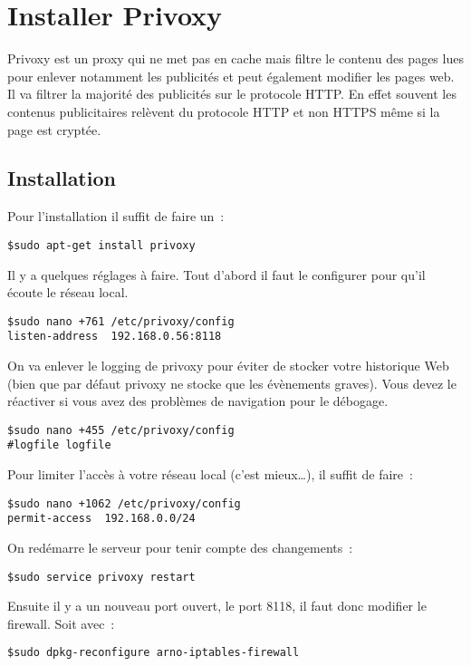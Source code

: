\section{Installer Privoxy}

Privoxy est un proxy qui ne met pas en cache mais filtre le contenu des pages lues pour enlever notamment les publicités et peut également modifier les pages web. Il va filtrer la majorité des publicités sur le protocole HTTP. En effet souvent les contenus publicitaires relèvent du protocole HTTP et non HTTPS même si la page est cryptée.

\subsection{Installation}

Pour l'installation il suffit de faire un~:
\begin{verbatim}
$sudo apt-get install privoxy
\end{verbatim}

Il y a quelques réglages à faire. Tout d'abord il faut le configurer pour qu'il écoute le réseau local.

\begin{verbatim}
$sudo nano +761 /etc/privoxy/config
listen-address  192.168.0.56:8118
\end{verbatim}

On va enlever le logging de privoxy pour éviter de stocker votre historique Web (bien que par défaut privoxy ne stocke que les évènements graves). Vous devez le réactiver si vous avez des problèmes de navigation pour le débogage.

\begin{verbatim}
$sudo nano +455 /etc/privoxy/config
#logfile logfile
\end{verbatim}

Pour limiter l'accès à votre réseau local (c'est mieux\dots), il suffit de faire~:
\begin{verbatim}
$sudo nano +1062 /etc/privoxy/config
permit-access  192.168.0.0/24
\end{verbatim}

On redémarre le serveur pour tenir compte des changements~:
\begin{verbatim}
$sudo service privoxy restart
\end{verbatim}

Ensuite il y a un nouveau port ouvert, le port 8118, il faut donc modifier le firewall. Soit avec~:
\begin{verbatim}
$sudo dpkg-reconfigure arno-iptables-firewall
\end{verbatim}

